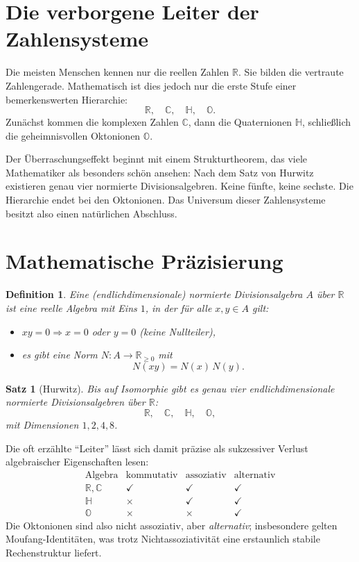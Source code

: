 \documentclass[11pt,a4paper]{article}
\newtheorem*{definition*}{Definition}
\newtheorem*{satz*}{Satz}
\begin{document}
\section{Die verborgene Leiter der Zahlensysteme}
Die meisten Menschen kennen nur die reellen Zahlen \(\mathbb R\). Sie bilden die vertraute Zahlengerade. Mathematisch ist dies jedoch nur die erste Stufe einer bemerkenswerten Hierarchie:
\[
\mathbb R,\quad \mathbb C,\quad \mathbb H,\quad \mathbb O.
\]
Zunächst kommen die komplexen Zahlen \(\mathbb C\), dann die Quaternionen \(\mathbb H\), schließlich die geheimnisvollen Oktonionen \(\mathbb O\).

Der Überraschungseffekt beginnt mit einem Strukturtheorem, das viele Mathematiker als besonders schön ansehen: Nach dem Satz von Hurwitz existieren genau vier normierte Divisionsalgebren. Keine fünfte, keine sechste. Die Hierarchie endet bei den Oktonionen. Das Universum dieser Zahlensysteme besitzt also einen natürlichen Abschluss.

\section{Mathematische Präzisierung}
\begin{definition*}
Eine (endlichdimensionale) \emph{normierte Divisionsalgebra} \(A\) über \(\mathbb R\) ist eine reelle Algebra mit Eins \(1\), in der für alle \(x,y \in A\) gilt:
\begin{itemize}
  \item \(xy=0 \Rightarrow x=0\) oder \(y=0\) (keine Nullteiler),
  \item es gibt eine Norm \(N:A\to\mathbb R_{\ge 0}\) mit
  \[
  N(xy)=N(x)\,N(y).
  \]
\end{itemize}
\end{definition*}

\begin{satz*}[Hurwitz]
Bis auf Isomorphie gibt es genau vier endlichdimensionale normierte Divisionsalgebren über \(\mathbb R\):
\[
\mathbb R,\quad \mathbb C,\quad \mathbb H,\quad \mathbb O,
\]
mit Dimensionen \(1,2,4,8\).
\end{satz*}

Die oft erzählte ``Leiter'' lässt sich damit präzise als sukzessiver Verlust algebraischer Eigenschaften lesen:
\[
\begin{array}{c|c|c|c}
\text{Algebra} & \text{kommutativ} & \text{assoziativ} & \text{alternativ}\\\hline
\mathbb R,\mathbb C & \checkmark & \checkmark & \checkmark\\
\mathbb H & \times & \checkmark & \checkmark\\
\mathbb O & \times & \times & \checkmark
\end{array}
\]
Die Oktonionen sind also nicht assoziativ, aber \emph{alternativ}; insbesondere gelten Moufang-Identitäten, was trotz Nichtassoziativität eine erstaunlich stabile Rechenstruktur liefert.
\end{document}
